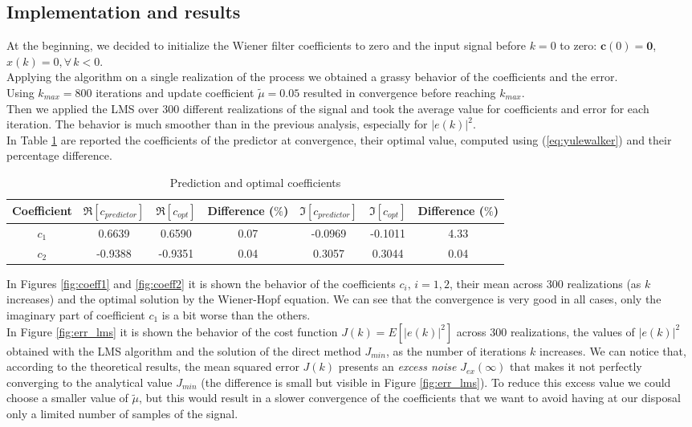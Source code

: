 \documentclass[a4paper, 12pt]{report}
\begin{document}
\subsection*{Implementation and results}
At the beginning, we decided to initialize the Wiener filter coefficients to zero and the input signal before $k=0$ to zero: $\mathbf{c}(0) = \mathbf{0}$, $x(k) = 0, \forall \, k<0$. \\
Applying the algorithm on a single realization of the process we obtained a grassy behavior of the coefficients and the error.\\
Using $k_{max} = 800$ iterations and update coefficient $\tilde{\mu} = 0.05$ resulted in convergence before reaching $k_{max}$.\\
Then we applied the LMS over 300 different realizations of the signal and took the average value for coefficients and error for each iteration. The behavior is much smoother than in the previous analysis, especially for $|e(k)|^2$.\\
In Table \ref{tab:predopt} are reported the coefficients of the predictor at convergence, their optimal value, computed using (\ref{eq:yulewalker}) and their percentage difference.

\begin{table}[H]
	\centering
	\begin{tabular}{c|cc|c|cc|c}
	\toprule
	Coefficient	& $\Re[c_{predictor}]$ 	& $\Re[c_{opt}]$	& Difference ($\%$)	& $\Im[c_{predictor}]$	& $\Im[c_{opt}]$ & Difference ($\%$) \\
	\midrule
	$c_1$ 	& 0.6639	& 0.6590		& 0.07 & -0.0969	& -0.1011	& 4.33 \\
	$c_2$	& -0.9388	& -0.9351		& 0.04 & 0.3057		& 0.3044 	& 0.04 \\
	\bottomrule
	\end{tabular}
	\caption{Prediction and optimal coefficients}
	\label{tab:predopt}
\end{table}

In Figures \ref{fig:coeff1} and \ref{fig:coeff2} it is shown the behavior of the coefficients $c_i, \, i=1,2$,  their mean across 300 realizations (as $k$ increases) and the optimal solution by the Wiener-Hopf equation. We can see that the convergence is very good in all cases, only the imaginary part of coefficient $c_1$ is a bit worse than the others.\\
In Figure \ref{fig:err_lms} it is shown the behavior of the cost function $J(k) = E \left[ |e(k)|^2 \right]$  across 300 realizations, the values of $|e(k)|^2$ obtained with the LMS algorithm and the solution of the direct method $J_{min}$, as the number of iterations $k$ increases. We can notice that, according to the theoretical results, the mean squared error $J(k)$ presents an \emph{excess noise} $J_{ex}(\infty)$ that makes it not perfectly converging to the analytical value $J_{min}$ (the difference is small but visible in Figure \ref{fig:err_lms}). To reduce this excess value we could choose a smaller value of $\tilde{\mu}$, but this would result in a slower convergence of the coefficients that we want to avoid having at our disposal only a limited number of samples of the signal.
\end{document}
